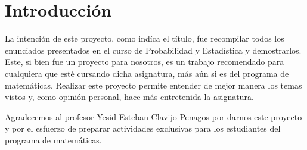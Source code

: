 \section{Introducción}

La intención de este proyecto, como indíca el título, fue recompilar
todos los enunciados presentados en el curso de Probabilidad y Estadística
y demostrarlos. Este, si bien fue un proyecto para nosotros, 
es un trabajo recomendado para cualquiera que esté cursando dicha
asignatura, más aún si es del programa de matemáticas. Realizar
este proyecto permite entender de mejor manera los temas vistos y,
como opinión personal, hace más entretenida la asignatura.

Agradecemos al profesor Yesid Esteban Clavijo Penagos por darnos
este proyecto y por el esfuerzo de preparar actividades exclusivas
para los estudiantes del programa de matemáticas.

\begin{center}
  \LARGE{\Coffeecup}
\end{center}
\clearpage